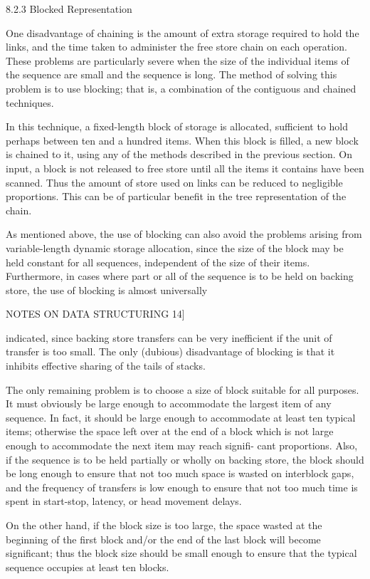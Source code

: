 {{{{				8.2.3 Blocked Representation
				
				One disadvantage of chaining is the amount of extra storage required to hold the links, and the time taken to administer the free store chain on each operation. These problems are particularly severe when the size of the individual items of the sequence are small and the sequence is long. The method of solving this problem is to use blocking; that is, a combination of the contiguous and chained techniques.
				
				In this technique, a fixed-length block of storage is allocated, sufficient to hold perhaps between ten and a hundred items. When this block is filled, a new block is chained to it, using any of the methods described in the previous section. On input, a block is not released to free store until all the items it contains have been scanned. Thus the amount of store used on links can be reduced to negligible proportions. This can be of particular benefit in the tree representation of the chain.
				
				As mentioned above, the use of blocking can also avoid the problems arising from variable-length dynamic storage allocation, since the size of the block may be held constant for all sequences, independent of the size of their items. Furthermore, in cases where part or all of the sequence is to be held on backing store, the use of blocking is almost universally
				
				NOTES ON DATA STRUCTURING 14]
				
				indicated, since backing store transfers can be very inefficient if the unit of transfer is too small. The only (dubious) disadvantage of blocking is that it inhibits effective sharing of the tails of stacks.
				
				The only remaining problem is to choose a size of block suitable for all purposes. It must obviously be large enough to accommodate the largest item of any sequence. In fact, it should be large enough to accommodate at least ten typical items; otherwise the space left over at the end of a block which is not large enough to accommodate the next item may reach signifi- cant proportions. Also, if the sequence is to be held partially or wholly on backing store, the block should be long enough to ensure that not too much space is wasted on interblock gaps, and the frequency of transfers is low enough to ensure that not too much time is spent in start-stop, latency, or head movement delays.
				
				On the other hand, if the block size is too large, the space wasted at the beginning of the first block and/or the end of the last block will become significant; thus the block size should be small enough to ensure that the typical sequence occupies at least ten blocks.
				
}}}}
